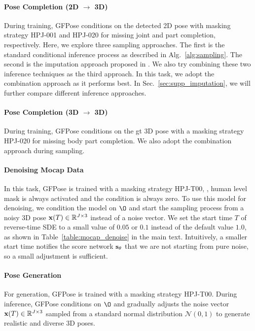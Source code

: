 \documentclass[10pt,twocolumn,letterpaper]{article}
\begin{document}
\paragraph{Pose Completion (2D $\rightarrow$ 3D)}
During training, GFPose conditions on the detected 2D pose with masking strategy HPJ-001 and HPJ-020 for missing joint and part completion, respectively. 
Here, we explore three sampling approaches. The first is the standard conditional inference process as described in Alg.~\ref{alg:sampling}. The second is the imputation approach proposed in \cite{song2020score}. We also try combining these two inference techniques as the third approach.  In this task, we adopt the combination approach as it performs best. In Sec.~\ref{sec:supp_imputation}, we will further compare different inference approaches.




\paragraph{Pose Completion (3D $\rightarrow$ 3D)}
During training, GFPose conditions on the gt 3D pose with a masking strategy HPJ-020 for missing body part completion. We also adopt the combination approach during sampling.




\paragraph{Denoising Mocap Data}
In this task, GFPose is trained with a masking strategy HPJ-T00, \ie, human level mask is always activated and the condition is always zero. To use this model for denoising, we condition the model on $\O$ and start the sampling process from a noisy 3D pose $\mathbf{x}(T) \in \mathbb{R}^{J \times 3}$ instead of a noise vector. We set the start time $T$ of reverse-time SDE to a small value of $0.05$ or $0.1$ instead of the default value $1.0$, as shown in Table~\ref{table:mocap_denoise} in the main text. Intuitively, a smaller start time notifies the score network $\mathbf{s}_{\theta}$ that we are not starting from pure noise, so a small adjustment is sufficient.

\paragraph{Pose Generation}
For generation, GFPose is trained with a masking strategy HPJ-T00. During inference, GFPose conditions on $\O$ and gradually adjusts the noise vector $\mathbf{x}(T) \in \mathbb{R}^{J \times 3}$ sampled from a standard normal distribution $\mathcal{N} (0, 1)$ to generate realistic and diverse 3D poses. 
\end{document}
